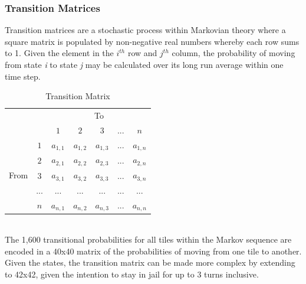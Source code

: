 \documentclass[12pt]{article}
\begin{document}
\subsubsection{Transition Matrices}
Transition matrices are a stochastic process within Markovian theory where a square matrix is populated by non-negative real numbers whereby each row sums to 1. Given the element in the $i^{th}$ row and $j^{th}$ column, the probability of moving from state \emph{i} to state \emph{j} may be calculated over its long run average within one time step.
\begin{table}[h]
\centering
\label{Transition Matrix}
\begin{tabular}{ccccccc}
                                           &                        & \multicolumn{5}{c}{To}                                                                                                     \\ \cline{3-7} 
                                           & \multicolumn{1}{c|}{}  & \multicolumn{1}{c|}{$1$} & \multicolumn{1}{c|}{$2$} & \multicolumn{1}{c|}{$3$} & \multicolumn{1}{c|}{...} & \multicolumn{1}{c|}{$n$} \\ \cline{2-7} 
\multicolumn{1}{c|}{\multirow{5}{*}{From}} & \multicolumn{1}{c|}{$1$} & \multicolumn{1}{c|}{$a_{1,1}$}  & \multicolumn{1}{c|}{$a_{1,2}$}  & \multicolumn{1}{c|}{$a_{1,3}$}  & \multicolumn{1}{c|}{...}  & \multicolumn{1}{c|}{$a_{1,n}$}  \\ \cline{2-7} 
\multicolumn{1}{c|}{}                      & \multicolumn{1}{c|}{$2$} & \multicolumn{1}{c|}{$a_{2,1}$}  & \multicolumn{1}{c|}{$a_{2,2}$}  & \multicolumn{1}{c|}{$a_{2,3}$}  & \multicolumn{1}{c|}{...}  & \multicolumn{1}{c|}{$a_{2,n}$}  \\ \cline{2-7} 
\multicolumn{1}{c|}{}                      & \multicolumn{1}{c|}{$3$} & \multicolumn{1}{c|}{$a_{3,1}$}  & \multicolumn{1}{c|}{$a_{3,2}$}  & \multicolumn{1}{c|}{$a_{3,3}$}  & \multicolumn{1}{c|}{...}  & \multicolumn{1}{c|}{$a_{3,n}$}  \\ \cline{2-7} 
\multicolumn{1}{c|}{}                      & \multicolumn{1}{c|}{...} & \multicolumn{1}{c|}{...}  & \multicolumn{1}{c|}{...}  & \multicolumn{1}{c|}{...}  & \multicolumn{1}{c|}{...}  & \multicolumn{1}{c|}{...}  \\ \cline{2-7} 
\multicolumn{1}{c|}{}                      & \multicolumn{1}{c|}{$n$} & \multicolumn{1}{c|}{$a_{n,1}$}  & \multicolumn{1}{c|}{$a_{n,2}$}  & \multicolumn{1}{c|}{$a_{n,3}$}  & \multicolumn{1}{c|}{...}  & \multicolumn{1}{c|}{$a_{n,n}$}  \\ \cline{2-7} 
\end{tabular}
\caption{Transition Matrix}
\end{table}
\\
The 1,600 transitional probabilities for all tiles within the Markov sequence are encoded in a 40x40 matrix of the probabilities of moving from one tile to another. Given the states, the transition matrix can be made more complex by extending to 42x42, given the intention to stay in jail for up to 3 turns inclusive.
\end{document}

